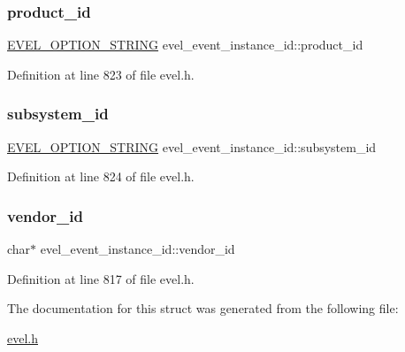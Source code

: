 \subsubsection{\texorpdfstring{product\+\_\+id}{product\_id}}
{\footnotesize\ttfamily \hyperlink{evel_8h_a0de5113a7b72de93c0c7b644f7ea7ec3}{E\+V\+E\+L\+\_\+\+O\+P\+T\+I\+O\+N\+\_\+\+S\+T\+R\+I\+NG} evel\+\_\+event\+\_\+instance\+\_\+id\+::product\+\_\+id}



Definition at line 823 of file evel.\+h.

\hypertarget{structevel__event__instance__id_a7647656f3b31ad441a4032796ef9144a}{}\label{structevel__event__instance__id_a7647656f3b31ad441a4032796ef9144a} 
\subsubsection{\texorpdfstring{subsystem\+\_\+id}{subsystem\_id}}
{\footnotesize\ttfamily \hyperlink{evel_8h_a0de5113a7b72de93c0c7b644f7ea7ec3}{E\+V\+E\+L\+\_\+\+O\+P\+T\+I\+O\+N\+\_\+\+S\+T\+R\+I\+NG} evel\+\_\+event\+\_\+instance\+\_\+id\+::subsystem\+\_\+id}



Definition at line 824 of file evel.\+h.

\hypertarget{structevel__event__instance__id_a6a15043bb2ff4df078e6a958b628e87a}{}\label{structevel__event__instance__id_a6a15043bb2ff4df078e6a958b628e87a} 
\subsubsection{\texorpdfstring{vendor\+\_\+id}{vendor\_id}}
{\footnotesize\ttfamily char$\ast$ evel\+\_\+event\+\_\+instance\+\_\+id\+::vendor\+\_\+id}



Definition at line 817 of file evel.\+h.



The documentation for this struct was generated from the following file\+:\begin{DoxyCompactItemize}
\item 
\hyperlink{evel_8h}{evel.\+h}\end{DoxyCompactItemize}
